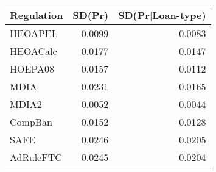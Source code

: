 \begin{tabular}{lrr}
  \hline
Regulation & SD(Pr) & SD(Pr$|$Loan-type) \\ 
  \hline
HEOAPEL & 0.0099 & 0.0083 \\ 
  HEOACalc & 0.0177 & 0.0147 \\ 
  HOEPA08 & 0.0157 & 0.0112 \\ 
  MDIA & 0.0231 & 0.0165 \\ 
  MDIA2 & 0.0052 & 0.0044 \\ 
  CompBan & 0.0152 & 0.0128 \\ 
  SAFE & 0.0246 & 0.0205 \\ 
  AdRuleFTC & 0.0245 & 0.0204 \\ 
   \hline
\end{tabular}
